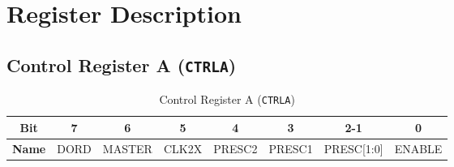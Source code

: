 \documentclass{article}
\begin{document}
\section{Register Description}

\subsection{Control Register A (\texttt{CTRLA})}
\label{sec:ctrla}

\begin{table}[H]
    \centering
    \caption{Control Register A (\texttt{CTRLA})}
    \begin{tabular}{@{}cccccccc@{}}
        \toprule
        \textbf{Bit} & 7 & 6 & 5 & 4 & 3 & 2-1 & 0 \\ \midrule
        \textbf{Name} & DORD & MASTER & CLK2X & PRESC2 & PRESC1 & PRESC[1:0] & ENABLE \\ \bottomrule
    \end{tabular}
    \label{tab:ctrl_a}
\end{table}
\end{document}
